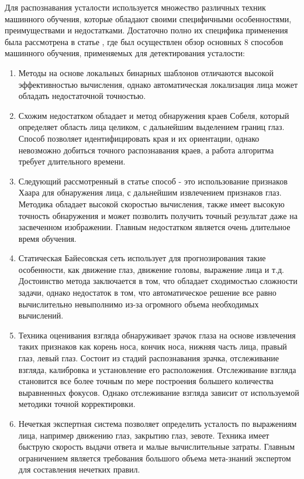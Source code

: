 \documentclass[12pt, letterpaper]{article}
\begin{document}
    Для распознавания усталости используется множество различных техник машинного обучения, которые обладают своими специфичными особенностями, преимуществами и недостатками. Достаточно полно их специфика применения была рассмотрена в статье \cite{yadav_survey_2020}, где был осуществлен обзор основных 8 способов машинного обучения, применяемых для детектирования усталости:
    \begin{enumerate} 
        \item Методы на основе локальных бинарных шаблонов отличаются высокой эффективностью вычисления, однако автоматическая локализация лица может обладать недостаточной точностью.
        \item Схожим недостатком обладает и метод обнаружения краев Собеля, который определяет область лица целиком, с дальнейшим выделением границ глаз. Способ позволяет идентифицировать края и их ориентации, однако невозможно добиться точного распознавания краев, а работа алгоритма требует длительного времени.
        \item Следующий рассмотренный в статье\cite{yadav_survey_2020} способ - это использование признаков Хаара для обнаружения лица,  с дальнейшим извлечением признаков глаз. Методика обладает высокой скоростью вычисления, также имеет высокую точность обнаружения и может позволить получить точный результат даже на засвеченном изображении. Главным недостатком является очень длительное время обучения.
        \item Статическая Байесовская сеть использует для прогнозирования такие особенности, как движение глаз, движение головы, выражение лица и т.д. Достоинство метода заключается в том, что обладает сходимостью сложности задачи, однако недостаток в том, что автоматическое решение все равно вычислительно невыполнимо из-за огромного объема необходимых вычислений.
        \item Техника оценивания взгляда обнаруживает зрачок глаза на основе извлечения таких признаков как корень носа, кончик носа, нижняя часть лица, правый глаз, левый глаз. Состоит из стадий распознавания зрачка, отслеживание взгляда, калибровка и установление его расположения. Отслеживание взгляда становится все более точным по мере построения большего количества выравненных фокусов. Однако отслеживание взгляда зависит от используемой методики точной корректировки.
        \item Нечеткая экспертная система позволяет определить усталость по выражениям лица, например движению глаз, закрытию глаз, зевоте. Техника имеет быструю скорость выдачи ответа и малые вычислительные затраты. Главным ограничением является требования большого объема мета-знаний экспертом для составления нечетких правил.

\end{enumerate}
\end{document}
